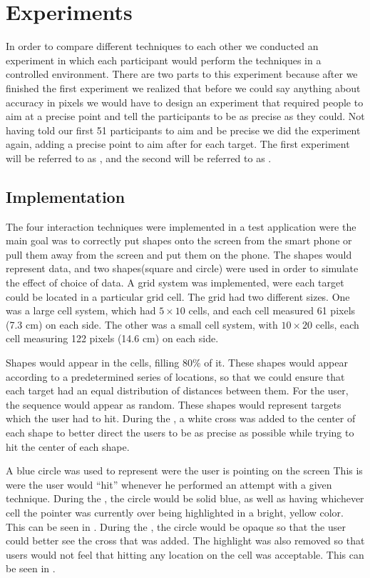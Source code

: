\section{Experiments} \label{sec:experiment}
In order to compare  different techniques to each other we conducted an experiment in which each participant would perform the techniques in a controlled environment.
There are two parts to this experiment because after we finished the first experiment we realized that before we could say anything about accuracy in pixels we would have to design an experiment that required people to aim at a precise point and tell the participants to be as precise as they could.
Not having told our first 51 participants to aim and be precise we did the experiment again, adding a precise point to aim after for each target.
The first  experiment will be referred to as \target, and the second will be referred to as \accuracy.

\subsection{Implementation}

The four interaction techniques were implemented in a test application were the main goal was to correctly put shapes onto the screen from the smart phone or pull them away from the screen and put them on the phone.
The shapes would represent data, and two shapes(square and circle) were used in order to simulate the effect of choice of data. 
A grid system was implemented, were each target could be located in a particular grid cell.
The grid had two different sizes.
One was a large cell system, which had $5\times10$ cells, and each cell measured 61 pixels (7.3 cm) on each side.
The other was a small cell system, with $10\times20$ cells, each cell measuring 122 pixels (14.6 cm)  on each side. 

Shapes would appear in the cells, filling 80\% of it. 
These shapes would appear according to a predetermined series of locations, so that we could ensure that each target had an equal distribution of distances between them. 
For the user, the sequence would appear as random. 
These shapes would represent targets which the user had to hit.
During the \accuracy, a white cross was added to the center of each shape to better direct the users to be as precise as possible while trying to hit the center of each shape.

A blue circle was used to represent were the user is pointing on the screen
This is were the user would ``hit'' whenever he performed an attempt with a given technique.
During the \target, the circle would be solid blue, as well as having whichever cell the pointer was currently over being highlighted in a bright, yellow color.
This can be seen in .
During the \accuracy, the circle would be opaque so that the user could better see the cross that was added.
The highlight was also removed so that users would not feel that hitting any location on the cell was acceptable. 
This can be seen in .

